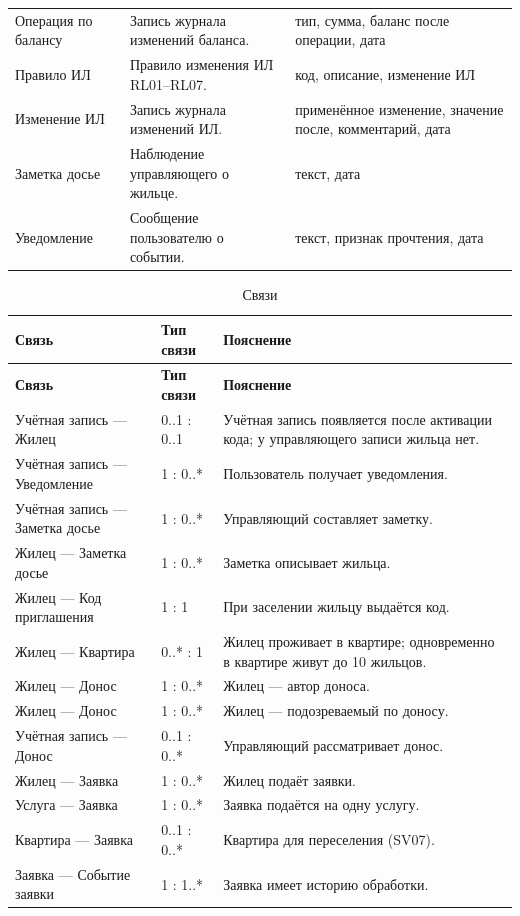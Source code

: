 \documentclass[12pt,a4paper]{article}
\begin{document}
\begin{longtable}{L{35.3mm} L{51.0mm} L{70.6mm}}
Операция по балансу & Запись журнала изменений баланса. & тип, сумма, баланс после операции, дата \\
Правило ИЛ & Правило изменения ИЛ RL01--RL07. & код, описание, изменение ИЛ \\
Изменение ИЛ & Запись журнала изменений ИЛ. & применённое изменение, значение после, комментарий, дата \\
Заметка досье & Наблюдение управляющего о жильце. & текст, дата \\
Уведомление & Сообщение пользователю о событии. & текст, признак прочтения, дата \\
\end{longtable}
\begin{longtable}{L{49.0mm} L{23.5mm} L{84.3mm}}
\caption{Связи}\label{tab:rel}\\
\toprule \textbf{Связь} & \textbf{Тип связи} & \textbf{Пояснение} \\ \midrule
\endfirsthead
\toprule \textbf{Связь} & \textbf{Тип связи} & \textbf{Пояснение} \\ \midrule
\endhead
\bottomrule
\endfoot
Учётная запись — Жилец & 0..1 : 0..1 & Учётная запись появляется после активации кода; у управляющего записи жильца нет. \\
Учётная запись — Уведомление & 1 : 0..* & Пользователь получает уведомления. \\
Учётная запись — Заметка досье & 1 : 0..* & Управляющий составляет заметку. \\
Жилец — Заметка досье & 1 : 0..* & Заметка описывает жильца. \\
Жилец — Код приглашения & 1 : 1 & При заселении жильцу выдаётся код. \\
Жилец — Квартира & 0..* : 1 & Жилец проживает в квартире; одновременно в квартире живут до 10 жильцов. \\
Жилец — Донос & 1 : 0..* & Жилец — автор доноса. \\
Жилец — Донос & 1 : 0..* & Жилец — подозреваемый по доносу. \\
Учётная запись — Донос & 0..1 : 0..* & Управляющий рассматривает донос. \\
Жилец — Заявка & 1 : 0..* & Жилец подаёт заявки. \\
Услуга — Заявка & 1 : 0..* & Заявка подаётся на одну услугу. \\
Квартира — Заявка & 0..1 : 0..* & Квартира для переселения (SV07). \\
Заявка — Событие заявки & 1 : 1..* & Заявка имеет историю обработки. \\

\end{longtable}
\end{document}
